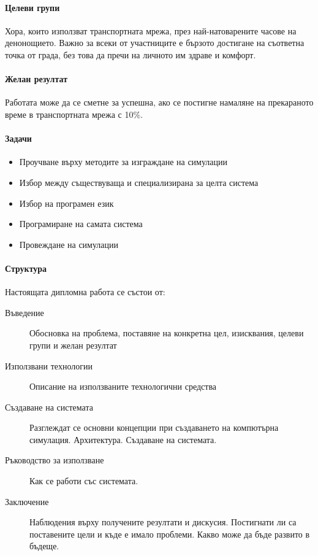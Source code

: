	\paragraph{Целеви групи}
	
		Хора, които използват транспортната мрежа, през най-натоварените часове на денонощието. Важно за всеки от участниците е бързото достигане на съответна точка от града, без това да пречи на личното им здраве и комфорт.
	
	\paragraph{Желан резултат}
	
		Работата може да се сметне за успешна, ако се постигне намаляне на прекараното време в транспортната мрежа с 10\%.
	
	\paragraph{Задачи}
	
		\begin{itemize}
			\item Проучване върху методите за изграждане на симулации
			\item Избор между съществуваща и специализирана за целта система
			\item Избор на програмен език
			\item Програмиране на самата система
			\item Провеждане на симулации
		\end{itemize}
	
	\paragraph{Структура}
	
		Настоящата дипломна работа се състои от:
	
		\begin{description}
			\item[Въведение] Обосновка на проблема, поставяне на конкретна цел, изисквания, целеви групи и желан резултат
			\item[Използвани технологии] Описание на използваните технологични средства
			\item[Създаване на системата] Разглеждат се основни концепции при създаването на компютърна симулация. Архитектура. 
			Създаване на системата.
			\item[Ръководство за използване] Как се работи със системата.
			\item[Заключение] Наблюдения върху получените резултати и дискусия. 
			Постигнати ли са поставените цели и къде е имало проблеми. Какво може да бъде развито в бъдеще.
		\end{description}